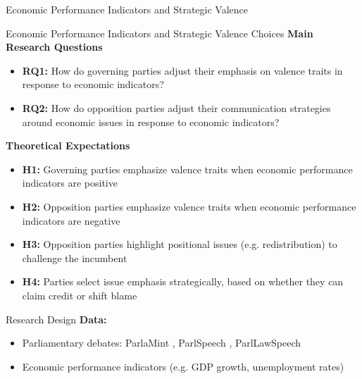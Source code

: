 \documentclass[9pt, aspectratio=169]{beamer}
\newcommand{\customcite}[1]{\textcolor{blue}{\footnotesize\parencite{#1}}}
\newcommand{\customcites}[1]{\textcolor{blue}{\footnotesize\parencites{#1}}}
\begin{document}
\begin{section}{Economic Performance Indicators and Strategic Valence}
\begin{frame}{Economic Performance Indicators and Strategic Valence Choices}
    \textbf{Main Research Questions} \vspace{0.1cm}
    \begin{itemize}
        \item \textbf{RQ1:} How do governing parties adjust their emphasis on valence traits in response to economic indicators?\vspace{0.1cm}
        \item \textbf{RQ2:} How do opposition parties adjust their communication strategies around economic issues in response to economic indicators?
    \end{itemize}
    \vspace{0.4cm}
    \textbf{Theoretical Expectations} \customcites{Hellwig2012, Green2012, Greene2015}\vspace{0.1cm}
\begin{itemize}
    \item \textbf{H1:} Governing parties emphasize valence traits when economic performance indicators are positive\vspace{0.1cm}
    \item \textbf{H2:} Opposition parties emphasize valence traits when economic performance indicators are negative\vspace{0.1cm}
    \item \textbf{H3:} Opposition parties highlight positional issues (e.g. redistribution) to challenge the incumbent\vspace{0.1cm}
    \item \textbf{H4:} Parties select issue emphasis strategically, based on whether they can claim credit or shift blame
\end{itemize}   
    \end{frame}

\begin{frame}{Research Design}
    \textbf{Data:} \vspace{0.1cm}
    \begin{itemize}
        \item Parliamentary debates: ParlaMint \customcite{erjavec2023parlamint}, ParlSpeech \customcite{rauh2020parlspeech}, ParlLawSpeech \customcite{Schwalbach2025} \vspace{0.1cm}
        \item Economic performance indicators (e.g. GDP growth, unemployment rates)
    \end{itemize}
    \vspace{0.3cm}
    

\end{frame}
\end{section}
\end{document}
